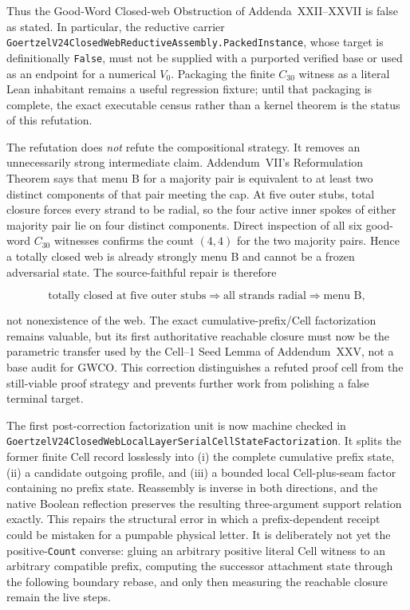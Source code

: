\documentclass[11pt]{article}
\theoremstyle{definition}
\begin{document}
Thus the Good-Word Closed-web Obstruction of Addenda~XXII--XXVII is false as
stated.  In particular, the reductive carrier
\texttt{GoertzelV24ClosedWebReductiveAssembly.PackedInstance}, whose target is
definitionally \texttt{False}, must not be supplied with a purported verified
base or used as an endpoint for a numerical $V_0$.  Packaging the finite
$C_{30}$ witness as a literal Lean inhabitant remains a useful regression
fixture; until that packaging is complete, the exact executable census rather
than a kernel theorem is the status of this refutation.

The refutation does \emph{not} refute the compositional strategy.  It removes
an unnecessarily strong intermediate claim.  Addendum~VII's Reformulation
Theorem says that menu B for a majority pair is equivalent to at least two
distinct components of that pair meeting the cap.  At five outer stubs, total
closure forces every strand to be radial, so the four active inner spokes of
either majority pair lie on four distinct components.  Direct inspection of
all six good-word $C_{30}$ witnesses confirms the count $(4,4)$ for the two
majority pairs.  Hence a totally closed web is already strongly menu B and
cannot be a frozen adversarial state.  The source-faithful repair is therefore

\[
  \text{totally closed at five outer stubs}
  \Longrightarrow \text{all strands radial}
  \Longrightarrow \text{menu B},
\]

not nonexistence of the web.  The exact cumulative-prefix/Cell factorization
remains valuable, but its first authoritative reachable closure must now be
the parametric transfer used by the Cell--1 Seed Lemma of Addendum~XXV, not a
base audit for GWCO.  This correction distinguishes a refuted proof cell from
the still-viable proof strategy and prevents further work from polishing a
false terminal target.

The first post-correction factorization unit is now machine checked in
\texttt{GoertzelV24ClosedWebLocalLayerSerialCellStateFactorization}.  It splits
the former finite Cell record losslessly into (i) the complete cumulative
prefix state, (ii) a candidate outgoing profile, and (iii) a bounded local
Cell-plus-seam factor containing no prefix state.  Reassembly is inverse in
both directions, and the native Boolean reflection preserves the resulting
three-argument support relation exactly.  This repairs the structural error
in which a prefix-dependent receipt could be mistaken for a pumpable physical
letter.  It is deliberately not yet the positive-\texttt{Count} converse:
gluing an arbitrary positive literal Cell witness to an arbitrary compatible
prefix, computing the successor attachment state through the following
boundary rebase, and only then measuring the reachable closure remain the live
steps.
\end{document}

